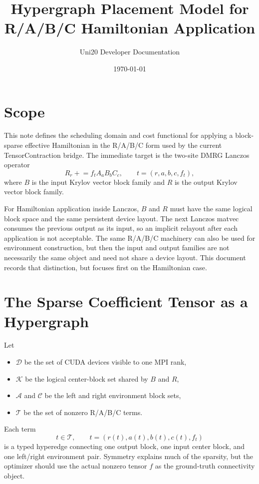 \documentclass[11pt]{article}
\title{Hypergraph Placement Model for R/A/B/C Hamiltonian Application}
\author{Uni20 Developer Documentation}
\date{\today}
\begin{document}
\maketitle

\section{Scope}

This note defines the scheduling domain and cost functional for applying a
block-sparse effective Hamiltonian in the R/A/B/C form used by the current
TensorContraction bridge.  The immediate target is the two-site DMRG Lanczos
operator
\begin{equation}
  R_r \mathrel{+}= f_t A_a B_b C_c,
  \qquad t = (r,a,b,c,f_t),
\end{equation}
where $B$ is the input Krylov vector block family and $R$ is the output Krylov
vector block family.

For Hamiltonian application inside Lanczos, $B$ and $R$ must have the same
logical block space and the same persistent device layout.  The next Lanczos
matvec consumes the previous output as its input, so an implicit relayout after
each application is not acceptable.  The same R/A/B/C machinery can also be
used for environment construction, but then the input and output families are
not necessarily the same object and need not share a device layout.  This
document records that distinction, but focuses first on the Hamiltonian case.

\section{The Sparse Coefficient Tensor as a Hypergraph}

Let
\begin{itemize}
  \item $\mathcal{D}$ be the set of CUDA devices visible to one MPI rank,
  \item $\mathcal{K}$ be the logical center-block set shared by $B$ and $R$,
  \item $\mathcal{A}$ and $\mathcal{C}$ be the left and right environment block sets,
  \item $\mathcal{T}$ be the set of nonzero R/A/B/C terms.
\end{itemize}
Each term
\begin{equation}
  t \in \mathcal{T}, \qquad t = (r(t),a(t),b(t),c(t),f_t)
\end{equation}
is a typed hyperedge connecting one output block, one input center block, and
one left/right environment pair.  Symmetry explains much of the sparsity, but
the optimizer should use the actual nonzero tensor $f$ as the ground-truth
connectivity object.
\end{document}
